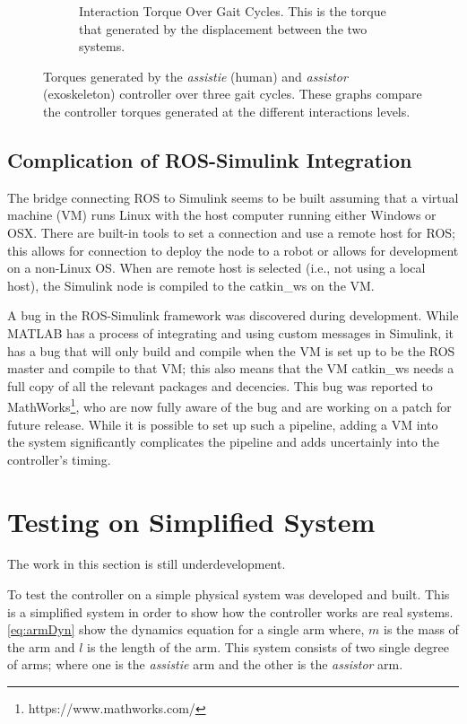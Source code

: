 \begin{figure}
\begin{subfigure}{0.8\linewidth}
        \caption[Interaction Torque Over Gait Cycles]{Interaction Torque Over Gait Cycles. This is the torque that generated by the displacement between the two systems.}
        \label{fig:InteractionTripleGaitInteration}
    \end{subfigure}
    \caption[Comparison of Torques for Gait Cycle]{Torques generated by the \textit{assistie} (human) and  \textit{assistor} (exoskeleton) controller over three gait cycles. These graphs compare the controller torques generated at the different interactions levels. }
    \label{fig:TorqueOverGaitCycles}
\end{figure}




\subsection{Complication of ROS-Simulink Integration}

The bridge connecting ROS to Simulink seems to be built assuming that a virtual machine (VM) runs Linux with the host computer running either Windows or OSX. There are built-in tools to set a connection and use a remote host for ROS; this allows for connection to deploy the node to a robot or allows for development on a non-Linux OS. When are remote host is selected (i.e., not using a local host), the Simulink node is compiled to the catkin\_ws on the VM. 

A bug in the ROS-Simulink framework was discovered during development. While MATLAB has a process of integrating and using custom messages in Simulink, it has a bug that will only build and compile when the VM is set up to be the ROS master and compile to that VM; this also means that the VM catkin\_ws needs a full copy of all the relevant packages and decencies. This bug was reported to MathWorks\footnote{https://www.mathworks.com/}, who are now fully aware of the bug and are working on a patch for future release. While it is possible to set up such a pipeline, adding a VM into the system significantly complicates the pipeline and adds uncertainly into the controller's timing. 



\section{Testing on Simplified System}

The work in this section is still underdevelopment. 


To test the controller on a simple physical system was developed and built. This is a simplified system in order to show how the controller works are real systems.  \autoref{eq:armDyn} show the dynamics equation for a single arm where, $m$ is the mass of the arm and $l$ is the length of the arm. This system consists of two single degree of arms; where one is the \textit{assistie} arm and the other is the \textit{assistor} arm.

